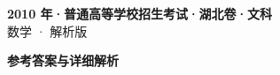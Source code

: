 \documentclass[zihao=-4, a4paper]{ctexart}
\begin{document}
\begin{center}
  {\Large\bfseries 2010 年·普通高等学校招生考试·湖北卷·文科}\\[4pt]
  {\large 数学 · 解析版}
\end{center}
\medskip
{}

\clearpage
{}
\begin{center}{\Large\bfseries 参考答案与详细解析}\end{center}
\medskip

\end{document}
